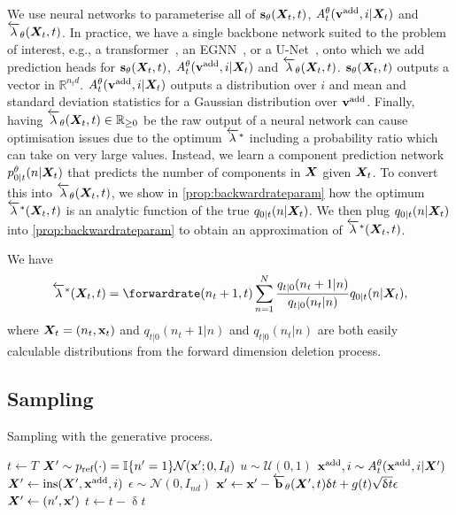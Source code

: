 We use neural networks to parameterise all of ${\mathbf{s}}_\theta({\bm{X}}_t, t)$, $A_t^\theta({\mathbf{v}}^{\textup{add}}, i | {\bm{X}}_t)$ and $\overleftarrow{\lambda}_\theta({\bm{X}}_t, t)$. In practice, we have a single backbone network suited to the problem of interest, e.g., a transformer~\citep{vaswani2017attention}, an EGNN~\citep{satorras2021n}, or a U-Net~\citep{ronneberger2015u}, onto which we add prediction heads for ${\mathbf{s}}_\theta({\bm{X}}_t, t)$, $A_t^\theta({\mathbf{v}}^{\textup{add}}, i | {\bm{X}}_t)$ and $\overleftarrow{\lambda}_\theta({\bm{X}}_t, t)$. ${\mathbf{s}}_\theta({\bm{X}}_t, t)$ outputs a vector in $\mathbb{R}^{n_t d}$. $A_t^\theta({\mathbf{v}}^{\textup{add}}, i | {\bm{X}}_t)$ outputs a distribution over $i$ and mean and standard deviation statistics for a Gaussian distribution over ${\mathbf{v}}^{\textup{add}}$. Finally, having $\overleftarrow{\lambda}_\theta({\bm{X}}_t, t) \in \mathbb{R}_{\geq 0}$ be the raw output of a neural network can cause optimisation issues due to the optimum $\overleftarrow{\lambda}^*$ including a probability ratio which can take on very large values. Instead, we learn a component prediction network $p^\theta_{0|t}(n | {\bm{X}}_t)$ that predicts the number of components in ${\bm{X}}$ given ${\bm{X}}_t$. To convert this into $\overleftarrow{\lambda}_\theta({\bm{X}}_t, t)$, we show in \cref{prop:backwardrateparam} how the optimum $\overleftarrow{\lambda}^*({\bm{X}}_t, t)$ is an analytic function of the true $q_{0|t}(n | {\bm{X}}_t)$. We then plug $q_{0|t}(n | {\bm{X}}_t)$ into \cref{prop:backwardrateparam} to obtain an approximation of $\overleftarrow{\lambda}^*({\bm{X}}_t, t)$.
\begin{proposition} We have
    \label{prop:backwardrateparam}
    \begin{equation}\label{eq:backwardrateparam}
        \backwardrate^*(\mX_t, t) = \forwardrate(n_t+1, t) \sum_{n=1}^N \frac{q_{t|0}(n_t + 1 | n)}{q_{t|0}(n_t | n)} q_{0|t}(n | \mX_t),
    \end{equation}
    where ${\bm{X}}_t = (n_t, {\mathbf{x}}_t)$ and $q_{t|0}(n_t + 1 | n)$ and $q_{t|0}(n_t | n)$ are both easily calculable distributions from the forward dimension deletion process.
\end{proposition}



\subsection{Sampling}

\begin{algorithm}[t]
\caption{Sampling with the generative process.}
\begin{algorithmic}[1] %
\State $t \leftarrow T$
\State ${\bm{X}}' \sim p_{\textup{ref}}(\cdot) = \mathbb{I}\{ n'=1\} \mathcal{N}({\mathbf{x}}'; 0, I_{d})$
    \State $u \sim \mathcal{U}(0, 1)$
        \State ${\mathbf{x}}^{\textup{add}}, i \sim A_{t}^\theta({\mathbf{x}}^{\textup{add}}, i | {\bm{X}}')$
        \State ${\bm{X}}' \leftarrow \text{ins}({\bm{X}}', {\mathbf{x}}^{\textup{add}}, i)$
    \EndIf
    \State $\epsilon \sim \mathcal{N}(0, I_{nd})$
    \State ${\mathbf{x}}' \leftarrow {\mathbf{x}}' - \overleftarrow{\mathbf{b}}_\theta({\bm{X}}', t) \updelta t + g(t) \sqrt{\updelta t} \epsilon$
    \State ${\bm{X}}' \leftarrow (n', {\mathbf{x}}')$
    \State $t \leftarrow t - \updelta t$
\EndWhile
\end{algorithmic}
\label{alg:backwardsampling}
\end{algorithm}

